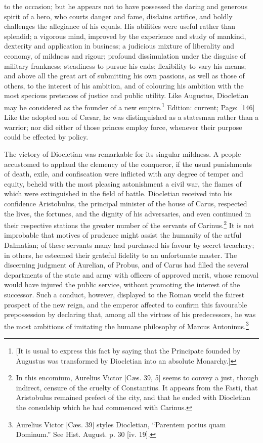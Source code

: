 to the occasion; but he appears not to have possessed the daring and generous spirit of a hero, who courts danger and fame, disdains artifice, and boldly challenges the allegiance of his equals. His abilities were useful rather than splendid; a vigorous mind, improved by the experience and study of mankind, dexterity and application in business; a judicious mixture of liberality and economy, of mildness and rigour; profound dissimulation under the disguise of military frankness; steadiness to pursue his ends; flexibility to vary his means; and above all the great art of submitting his own passions, as well as those of others, to the interest of his ambition, and of colouring his ambition with the most specious pretences of justice and public utility. Like Augustus, Diocletian may be considered as the founder of a new empire.\footnote{[It is usual to express this fact by saying that the Principate founded by Augustus was transformed by Diocletian into an absolute Monarchy.]} Edition: current; Page: [146] Like the adopted son of Cæsar, he was distinguished as a statesman rather than a warrior; nor did either of those princes employ force, whenever their purpose could be effected by policy.

The victory of Diocletian was remarkable for its singular mildness. A people accustomed to applaud the clemency of the conqueror, if the usual punishments of death, exile, and confiscation were inflicted with any degree of temper and equity, beheld with the most pleasing astonishment a civil war, the flames of which were extinguished in the field of battle. Diocletian received into his confidence Aristobulus, the principal minister of the house of Carus, respected the lives, the fortunes, and the dignity of his adversaries, and even continued in their respective stations the greater number of the servants of Carinus.\footnote{In this encomium, Aurelius Victor [Cæs. 39, 5] seems to convey a just, though indirect, censure of the cruelty of Constantius. It appears from the Fasti, that Aristobulus remained prefect of the city, and that he ended with Diocletian the consulship which he had commenced with Carinus.} It is not improbable that motives of prudence might assist the humanity of the artful Dalmatian; of these servants many had purchased his favour by secret treachery; in others, he esteemed their grateful fidelity to an unfortunate master. The discerning judgment of Aurelian, of Probus, and of Carus had filled the several departments of the state and army with officers of approved merit, whose removal would have injured the public service, without promoting the interest of the successor. Such a conduct, however, displayed to the Roman world the fairest prospect of the new reign, and the emperor affected to confirm this favourable prepossession by declaring that, among all the virtues of his predecessors, he was the most ambitious of imitating the humane philosophy of Marcus Antoninus.\footnote{Aurelius Victor [Cæs. 39] styles Diocletian, \texthebrew{“}Parentem potius quam Dominum.\texthebrew{}” See Hist. August. p. 30 [iv. 19].}

